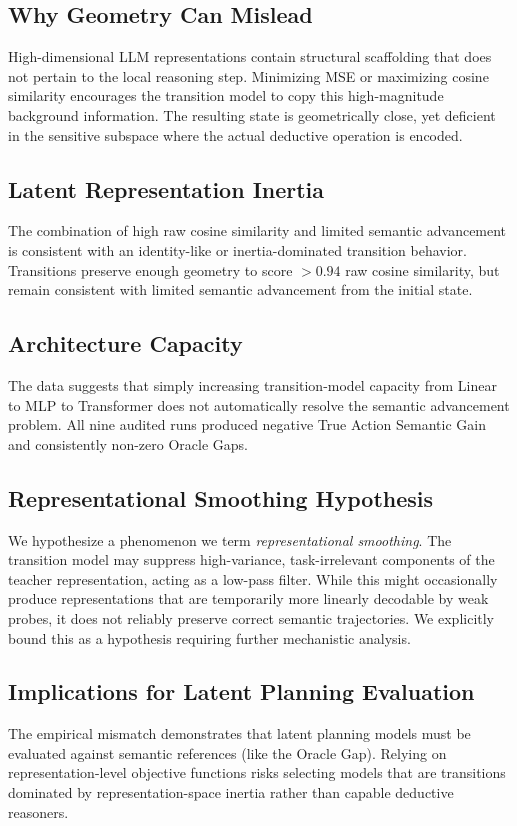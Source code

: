 \documentclass[conference]{IEEEtran}
\begin{document}
\subsection{Why Geometry Can Mislead}
High-dimensional LLM representations contain structural scaffolding that does not pertain to the local reasoning step. Minimizing MSE or maximizing cosine similarity encourages the transition model to copy this high-magnitude background information. The resulting state is geometrically close, yet deficient in the sensitive subspace where the actual deductive operation is encoded.

\subsection{Latent Representation Inertia}
The combination of high raw cosine similarity and limited semantic advancement is consistent with an identity-like or inertia-dominated transition behavior. Transitions preserve enough geometry to score $>0.94$ raw cosine similarity, but remain consistent with limited semantic advancement from the initial state.

\subsection{Architecture Capacity}
The data suggests that simply increasing transition-model capacity from Linear to MLP to Transformer does not automatically resolve the semantic advancement problem. All nine audited runs produced negative True Action Semantic Gain and consistently non-zero Oracle Gaps.

\subsection{Representational Smoothing Hypothesis}
We hypothesize a phenomenon we term \textit{representational smoothing}. The transition model may suppress high-variance, task-irrelevant components of the teacher representation, acting as a low-pass filter. While this might occasionally produce representations that are temporarily more linearly decodable by weak probes, it does not reliably preserve correct semantic trajectories. We explicitly bound this as a hypothesis requiring further mechanistic analysis.

\subsection{Implications for Latent Planning Evaluation}
The empirical mismatch demonstrates that latent planning models must be evaluated against semantic references (like the Oracle Gap). Relying on representation-level objective functions risks selecting models that are transitions dominated by representation-space inertia rather than capable deductive reasoners.
\end{document}

